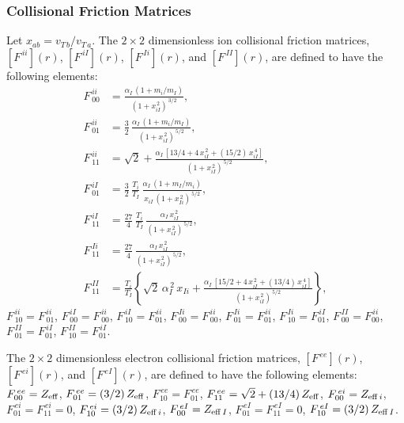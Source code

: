 \documentclass[12pt,prb,aps]{revtex4-1}
\begin{document}
\subsubsection{Collisional Friction Matrices}
Let $x_{ab}=v_{T\,b}/v_{T\,a}$. The  $2\times 2$ dimensionless ion collisional friction matrices, $[F^{\,ii}](r)$, $[F^{\,iI}](r)$, $[F^{\,Ii}](r)$, and $[F^{\,II}](r)$, are defined to have the following elements:
\begin{align}
F^{\,ii}_{\,00} &= \frac{\alpha_I\,(1+m_i/m_I)}{(1+x_{iI}^{\,2})^{\,3/2}},\\[0.5ex]
F^{\,ii}_{\,01}&=\frac{3}{2}\,\frac{\alpha_I\,(1+m_i/m_I)}{(1+x_{iI}^{\,2})^{\,5/2}},\\[0.5ex]
F^{\,ii}_{\,11}& =\sqrt{2}+ \frac{\alpha_I\,[13/4+4\,x_{iI}^{\,2}+(15/2)\,x_{iI}^{\,4}]}{(1+x_{iI}^{\,2})^{\,5/2}},\\[0.5ex]
F^{\,iI}_{\,01}&=\frac{3}{2}\,\frac{T_i}{T_I}\,\frac{\alpha_I\,(1+m_I/m_i)}{x_{iI}\,(1+x_{Ii}^{\,2})^{\,5/2}},\\[0.5ex]
F^{\,iI}_{\,11}& =\frac{27}{4}\,\frac{T_i}{T_I}\,\frac{\alpha_I\,x_{iI}^{\,2}}{(1+x_{iI}^{\,2})^{\,5/2}},\\[0.5ex]
F^{\,Ii}_{\,11}& =\frac{27}{4}\,\frac{\alpha_I\,x_{iI}^{\,2}}{(1+x_{iI}^{\,2})^{\,5/2}},\\[0.5ex]
F^{\,II}_{\,11}& =\frac{T_i}{T_I}\left\{\sqrt{2}\,\alpha_I^{\,2}\,x_{Ii} + \frac{\alpha_I\,[
15/2+4\,x_{iI}^{\,2}+(13/4)\,x_{iI}^{\,4}]}{(1+x_{iI}^{\,2})^{\,5/2}}\right\},
\end{align}
 $F^{\,ii}_{\,10}=F^{\,ii}_{\,01}$, $F^{\,iI}_{\,00} =F^{\,ii}_{\,00}$, $F^{\,iI}_{\,10}=F^{\,ii}_{01}$, $F^{\,Ii}_{\,00} =F^{\,ii}_{\,00}$,
$F^{\,Ii}_{\,01}=F^{\,ii}_{01}$, 
$F^{\,Ii}_{\,10}=F^{\,iI}_{01}$, $F^{\,II}_{\,00} =F^{\,ii}_{00}$,
$F^{\,II}_{\,01}=F^{\,iI}_{01}$, 
$F^{\,II}_{\,10}=F^{\,iI}_{01}$.

The $2\times 2$ dimensionless electron collisional friction matrices, $[F^{\,ee}](r)$,   $[F^{\,ei}](r)$, and
$[F^{\,eI}](r)$, are defined to have the following elements:
$F^{\,ee}_{00} = Z_{\rm eff}$,
$F^{\,ee}_{01} = (3/2)\,Z_{\rm eff}$,
$F^{\,ee}_{10} = F^{\,ee}_{01}$,
$F^{\,ee}_{11}= \sqrt{2} + (13/4)\,Z_{\rm eff}$, $F^{\,ei}_{00} = Z_{{\rm eff}\,i}$,
$F^{\,ei}_{01} =F^{\,ei}_{11}=0$, $F^{\,ei}_{10}=(3/2)\,Z_{{\rm eff}\,i}$,  $F^{\,eI}_{00} = Z_{{\rm eff}\,I}$,
$F^{\,eI}_{01} =F^{\,eI}_{11}=0$, $F^{\,eI}_{10}=(3/2)\,Z_{{\rm eff}\,I}$. 
\end{document}
